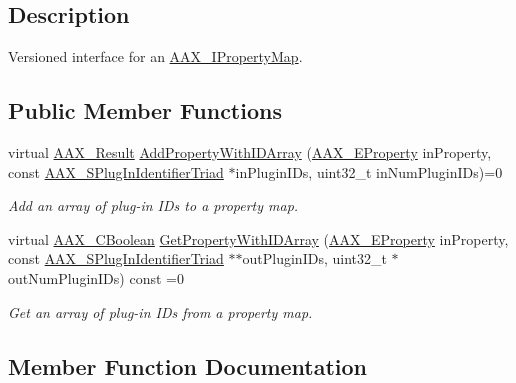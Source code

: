 \subsection{Description}
Versioned interface for an \mbox{\hyperlink{a01869}{A\+A\+X\+\_\+\+I\+Property\+Map}}. \subsection*{Public Member Functions}
\begin{DoxyCompactItemize}
\item 
virtual \mbox{\hyperlink{a00392_a4d8f69a697df7f70c3a8e9b8ee130d2f}{A\+A\+X\+\_\+\+Result}} \mbox{\hyperlink{a01749_a364725ce288b0b5e4d0a98d2451b8878}{Add\+Property\+With\+I\+D\+Array}} (\mbox{\hyperlink{a00662_a13e384f22825afd3db6d68395b79ce0d}{A\+A\+X\+\_\+\+E\+Property}} in\+Property, const \mbox{\hyperlink{a01425}{A\+A\+X\+\_\+\+S\+Plug\+In\+Identifier\+Triad}} $\ast$in\+Plugin\+I\+Ds, uint32\+\_\+t in\+Num\+Plugin\+I\+Ds)=0
\begin{DoxyCompactList}\small\item\em Add an array of plug-\/in I\+Ds to a property map. \end{DoxyCompactList}\item 
virtual \mbox{\hyperlink{a00392_aa216506530f1d19a2965931ced2b274b}{A\+A\+X\+\_\+\+C\+Boolean}} \mbox{\hyperlink{a01749_a14d209356ee302cfb0d500cc7ee23764}{Get\+Property\+With\+I\+D\+Array}} (\mbox{\hyperlink{a00662_a13e384f22825afd3db6d68395b79ce0d}{A\+A\+X\+\_\+\+E\+Property}} in\+Property, const \mbox{\hyperlink{a01425}{A\+A\+X\+\_\+\+S\+Plug\+In\+Identifier\+Triad}} $\ast$$\ast$out\+Plugin\+I\+Ds, uint32\+\_\+t $\ast$out\+Num\+Plugin\+I\+Ds) const =0
\begin{DoxyCompactList}\small\item\em Get an array of plug-\/in I\+Ds from a property map. \end{DoxyCompactList}\end{DoxyCompactItemize}


\subsection{Member Function Documentation}
\mbox{\label{a01749_a364725ce288b0b5e4d0a98d2451b8878}} 
